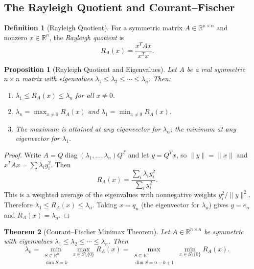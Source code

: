 \documentclass[11pt,a4paper]{article}
\theoremstyle{definition}
\newtheorem{definition}{Definition}[section]
\theoremstyle{plain}
\newtheorem{theorem}{Theorem}[section]
\newtheorem{proposition}[theorem]{Proposition}
\theoremstyle{remark}
\newcommand{\R}{\mathbb{R}}
\DeclareMathOperator{\diag}{diag}
\begin{document}
\subsection{The Rayleigh Quotient and Courant--Fischer}
\label{subsec:rayleigh}

\begin{definition}[Rayleigh Quotient]
\label{def:rayleigh}
For a symmetric matrix $A \in \R^{n \times n}$ and nonzero $x \in \R^n$, the
\emph{Rayleigh quotient} is
\[
    R_A(x) = \frac{x^T A x}{x^T x}.
\]
\end{definition}

\begin{proposition}[Rayleigh Quotient and Eigenvalues]
\label{prop:rayleigh_bounds}
Let $A$ be a real symmetric $n \times n$ matrix with eigenvalues
$\lambda_1 \leq \lambda_2 \leq \cdots \leq \lambda_n$. Then:
\begin{enumerate}[nosep,label=(\roman*)]
    \item $\lambda_1 \leq R_A(x) \leq \lambda_n$ for all $x \neq 0$.
    \item $\lambda_n = \max_{x \neq 0} R_A(x)$ and $\lambda_1 = \min_{x \neq 0} R_A(x)$.
    \item The maximum is attained at any eigenvector for $\lambda_n$; the minimum at any
          eigenvector for $\lambda_1$.
\end{enumerate}
\end{proposition}

\begin{proof}
Write $A = Q \diag(\lambda_1, \ldots, \lambda_n) Q^T$ and let $y = Q^T x$, so
$\|y\| = \|x\|$ and $x^TAx = \sum \lambda_i y_i^2$. Then
\[
    R_A(x) = \frac{\sum_i \lambda_i y_i^2}{\sum_i y_i^2}.
\]
This is a weighted average of the eigenvalues with nonnegative weights $y_i^2 / \|y\|^2$.
Therefore $\lambda_1 \leq R_A(x) \leq \lambda_n$. Taking $x = q_n$ (the eigenvector for
$\lambda_n$) gives $y = e_n$ and $R_A(x) = \lambda_n$.
\end{proof}

\begin{theorem}[Courant--Fischer Minimax Theorem]
\label{thm:courant_fischer}
Let $A \in \R^{n \times n}$ be symmetric with eigenvalues
$\lambda_1 \leq \lambda_2 \leq \cdots \leq \lambda_n$. Then
\[
    \lambda_k = \min_{\substack{S \subseteq \R^n \\ \dim S = k}} \max_{x \in S \setminus \{0\}} R_A(x)
    = \max_{\substack{S \subseteq \R^n \\ \dim S = n-k+1}} \min_{x \in S \setminus \{0\}} R_A(x).
\]
\end{theorem}
\end{document}
